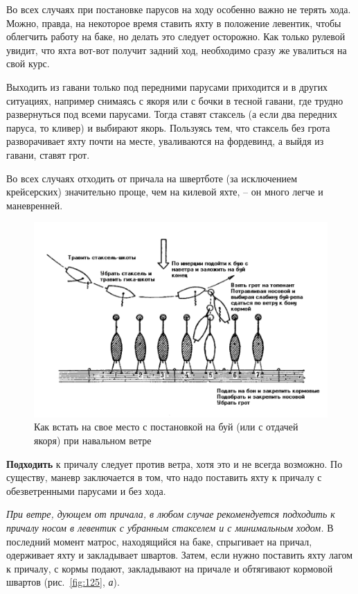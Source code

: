 \documentclass[a4paper, 12pt, twoside, final]{scrbook}
\begin{document}
Во всех случаях при постановке парусов на ходу особенно важно не терять хода. Можно, правда, на некоторое время ставить яхту в положение левентик, чтобы облегчить работу на баке, но делать это следует осторожно. Как только рулевой увидит, что яхта вот-вот получит задний ход, необходимо сразу же увалиться на свой курс.

Выходить из гавани только под передними парусами приходится и в других ситуациях, например снимаясь с якоря или с бочки в тесной гавани, где трудно развернуться под всеми парусами. Тогда ставят стаксель (а если два передних паруса, то кливер) и выбирают якорь. Пользуясь тем, что стаксель без грота разворачивает яхту почти на месте, уваливаются на фордевинд, а выйдя из гавани, ставят грот.

Во всех случаях отходить от причала на швертботе (за исключением крейсерских) значительно проще, чем на килевой яхте, \--- он много легче и маневренней.

\begin{figure}[htbp]
   \centering
   \includegraphics{126_Kak_vstat_na_mesto} %
   \caption{Как встать на свое место с постановкой на буй (или с отдачей якоря) при навальном ветре}
   \label{fig:126}
\end{figure}

\textbf{Подходить} к причалу следует против ветра, хотя это и не всегда возможно. По существу, маневр заключается в том, что надо поставить яхту к причалу с обезветренными парусами и без хода.

\textit{При ветре, дующем от причала, в любом случае рекомендуется подходить к причалу носом в левентик с убранным стакселем и с минимальным ходом.} В последний момент матрос, находящийся на баке, спрыгивает на причал, одерживает яхту и закладывает швартов. Затем, если нужно поставить яхту лагом к причалу, с кормы подают, закладывают на причале и обтягивают кормовой швартов (рис.~\ref{fig:125}, \textit{а}).
\end{document}
